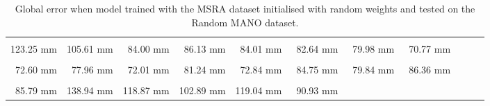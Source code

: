 \begin{table}[!ht]
    \begin{tabular}{|c|c|c|c|c|c|c|c|c|c|c|}
    \hline
    \cellcolor[HTML]{ff0000}{\bfseries Wrist} & \cellcolor[HTML]{ff0000}{\bfseries IMCP} & \cellcolor[HTML]{ff2500}{\bfseries IPIP} & \cellcolor[HTML]{ff2500}{\bfseries IDIP} & \cellcolor[HTML]{ff2500}{\bfseries ITIP} & \cellcolor[HTML]{ff2500}{\bfseries MMCP} & \cellcolor[HTML]{ff7500}{\bfseries MPIP} & \cellcolor[HTML]{ff7500}{\bfseries MDIP}  \\
    \cellcolor[HTML]{ff0000}123.25 mm & \cellcolor[HTML]{ff0000}105.61 mm & \cellcolor[HTML]{ff2500}$\,\,\,$84.00 mm & \cellcolor[HTML]{ff2500}$\,\,\,$86.13 mm & \cellcolor[HTML]{ff2500}$\,\,\,$84.01 mm & \cellcolor[HTML]{ff2500}$\,\,\,$82.64 mm & \cellcolor[HTML]{ff7500}$\,\,\,$79.98 mm & \cellcolor[HTML]{ff7500}$\,\,\,$70.77 mm\\
    \hline
    \cellcolor[HTML]{ff7500}{\bfseries MTIP} & \cellcolor[HTML]{ff7500}{\bfseries RMCP} & \cellcolor[HTML]{ff7500}{\bfseries RPIP} & \cellcolor[HTML]{ff2500}{\bfseries RDIP} & \cellcolor[HTML]{ff7500}{\bfseries RTIP} & \cellcolor[HTML]{ff2500}{\bfseries PMCP} & \cellcolor[HTML]{ff7500}{\bfseries PPIP} & \cellcolor[HTML]{ff2500}{\bfseries PDIP}  \\
    \cellcolor[HTML]{ff7500}$\,\,\,$72.60 mm & \cellcolor[HTML]{ff7500}$\,\,\,$77.96 mm & \cellcolor[HTML]{ff7500}$\,\,\,$72.01 mm & \cellcolor[HTML]{ff2500}$\,\,\,$81.24 mm & \cellcolor[HTML]{ff7500}$\,\,\,$72.84 mm & \cellcolor[HTML]{ff2500}$\,\,\,$84.75 mm & \cellcolor[HTML]{ff7500}$\,\,\,$79.84 mm & \cellcolor[HTML]{ff2500}$\,\,\,$86.36 mm\\
    \hline
    \cellcolor[HTML]{ff2500}{\bfseries PTIP} & \cellcolor[HTML]{ff0000}{\bfseries TMCP} & \cellcolor[HTML]{ff0000}{\bfseries TPIP} & \cellcolor[HTML]{ff0000}{\bfseries PDIP} & \cellcolor[HTML]{ff0000}{\bfseries TTIP} & \cellcolor[HTML]{ff0000}{\bfseries Average}  \\
    \cellcolor[HTML]{ff2500}$\,\,\,$85.79 mm & \cellcolor[HTML]{ff0000}138.94 mm & \cellcolor[HTML]{ff0000}118.87 mm & \cellcolor[HTML]{ff0000}102.89 mm & \cellcolor[HTML]{ff0000}119.04 mm & \cellcolor[HTML]{ff0000}$\,\,\,$90.93 mm \\
    \cline{1-6}
    \end{tabular}
    \caption{Global error when model trained with the MSRA dataset initialised with random weights and tested on the Random MANO dataset.}
    \label{tb:baseline_mano:g}
    \end{table}
